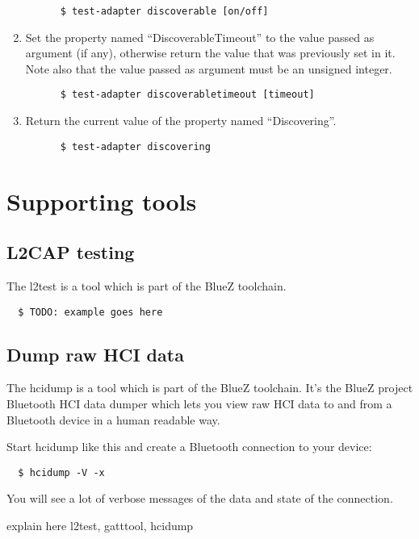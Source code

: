 \documentclass[11pt]{article}
\begin{document}
\begin{enumerate}
\begin{verbatim}
      $ test-adapter discoverable [on/off]
    \end{verbatim}
  \item Set the property named ``DiscoverableTimeout'' to the value
        passed as argument (if any), otherwise return the value that
        was previously set in it. Note also that the value passed as
        argument must be an unsigned integer.
    \begin{verbatim}
      $ test-adapter discoverabletimeout [timeout]
    \end{verbatim}
  \item Return the current value of the property named ``Discovering''.
    \begin{verbatim}
      $ test-adapter discovering
    \end{verbatim}
\end{enumerate}

\section{Supporting tools}

\subsection{L2CAP testing}

The l2test is a tool which is part of the BlueZ toolchain.

\begin{verbatim}
  $ TODO: example goes here
\end{verbatim}

\subsection{Dump raw HCI data}

The hcidump is a tool which is part of the BlueZ toolchain. It's the
BlueZ project Bluetooth HCI data dumper which lets you view raw HCI
data to and from a Bluetooth device in a human readable way.

Start hcidump like this and create a Bluetooth connection to your
device:
\begin{verbatim}
  $ hcidump -V -x
\end{verbatim}

You will see a lot of verbose messages of the data and state of the connection.

explain here l2test, gatttool, hcidump
\end{document}
